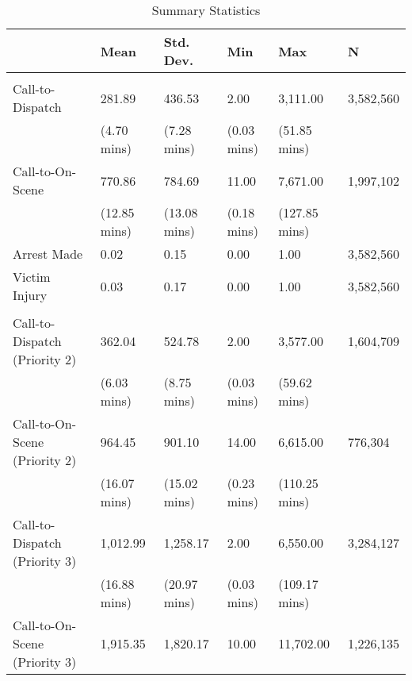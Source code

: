 \begin{table}[H]

\caption{\label{summary_stats}Summary Statistics}
\centering
\fontsize{10}{12}\selectfont
\begin{threeparttable}
\begin{tabular}[t]{llllll}
\toprule
  & Mean & Std. Dev. & Min & Max & N\\
\midrule
\addlinespace[0.3em]
\multicolumn{6}{l}{\textbf{Panel A: Priority 1 Outcomes:}}\\
\hspace{1em}Call-to-Dispatch & 281.89 & 436.53 & 2.00 & 3,111.00 & 3,582,560\\
\hspace{1em} & (4.70 mins) & (7.28 mins) & (0.03 mins) & (51.85 mins) & \\
\hspace{1em}Call-to-On-Scene & 770.86 & 784.69 & 11.00 & 7,671.00 & 1,997,102\\
\hspace{1em} & (12.85 mins) & (13.08 mins) & (0.18 mins) & (127.85 mins) & \\
\hspace{1em}Arrest Made & 0.02 & 0.15 & 0.00 & 1.00 & 3,582,560\\
\hspace{1em}Victim Injury & 0.03 & 0.17 & 0.00 & 1.00 & 3,582,560\\
\addlinespace[0.5cm]
\multicolumn{6}{l}{\textbf{Panel B: Secondary Outcomes:}}\\
\hspace{1em}Call-to-Dispatch (Priority 2) & 362.04 & 524.78 & 2.00 & 3,577.00 & 1,604,709\\
\hspace{1em} & (6.03 mins) & (8.75 mins) & (0.03 mins) & (59.62 mins) & \\
\hspace{1em}Call-to-On-Scene (Priority 2) & 964.45 & 901.10 & 14.00 & 6,615.00 & 776,304\\
\hspace{1em} & (16.07 mins) & (15.02 mins) & (0.23 mins) & (110.25 mins) & \\
\hspace{1em}Call-to-Dispatch (Priority 3) & 1,012.99 & 1,258.17 & 2.00 & 6,550.00 & 3,284,127\\
\hspace{1em} & (16.88 mins) & (20.97 mins) & (0.03 mins) & (109.17 mins) & \\
\hspace{1em}Call-to-On-Scene (Priority 3) & 1,915.35 & 1,820.17 & 10.00 & 11,702.00 & 1,226,135\\

\end{tabular}
\end{threeparttable}
\end{table}
